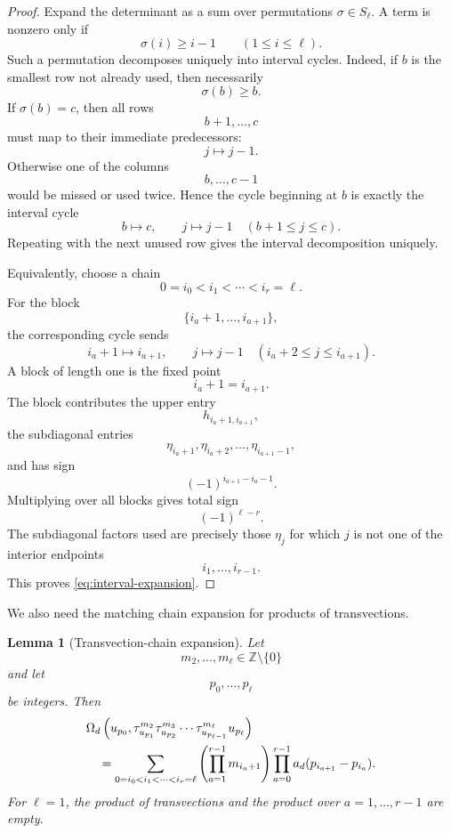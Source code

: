 \documentclass[a4paper,11pt]{amsart}
\newcommand{\Z}{\mathbb Z}
\newtheorem{lemma}[theorem]{Lemma}
\theoremstyle{remark}
\numberwithin{equation}{section}
\begin{document}
\begin{proof}
Expand the determinant as a sum over permutations \(\sigma\in S_\ell\). A term is nonzero only if
\[
\sigma(i)\geq i-1
\qquad(1\leq i\leq\ell).
\]
Such a permutation decomposes uniquely into interval cycles. Indeed, if \(b\) is the smallest row not already used, then necessarily
\[
\sigma(b)\geq b.
\]
If \(\sigma(b)=c\), then all rows
\[
b+1,\ldots,c
\]
must map to their immediate predecessors:
\[
j\longmapsto j-1.
\]
Otherwise one of the columns
\[
b,\ldots,c-1
\]
would be missed or used twice. Hence the cycle beginning at \(b\) is exactly the interval cycle
\[
b\longmapsto c,
\qquad
j\longmapsto j-1
\quad(b+1\leq j\leq c).
\]
Repeating with the next unused row gives the interval decomposition uniquely.

Equivalently, choose a chain
\[
0=i_0<i_1<\cdots<i_r=\ell.
\]
For the block
\[
\{i_a+1,\ldots,i_{a+1}\},
\]
the corresponding cycle sends
\[
i_a+1\longmapsto i_{a+1},
\qquad
j\longmapsto j-1
\quad(i_a+2\leq j\leq i_{a+1}).
\]
A block of length one is the fixed point
\[
i_a+1=i_{a+1}.
\]
The block contributes the upper entry
\[
h_{i_a+1,i_{a+1}},
\]
the subdiagonal entries
\[
\eta_{i_a+1},\eta_{i_a+2},\ldots,\eta_{i_{a+1}-1},
\]
and has sign
\[
(-1)^{i_{a+1}-i_a-1}.
\]
Multiplying over all blocks gives total sign
\[
(-1)^{\ell-r}.
\]
The subdiagonal factors used are precisely those \(\eta_j\) for which \(j\) is not one of the interior endpoints
\[
i_1,\ldots,i_{r-1}.
\]
This proves \eqref{eq:interval-expansion}.
\end{proof}

We also need the matching chain expansion for products of transvections.

\begin{lemma}[Transvection-chain expansion]\label{lem:chain-expansion}
Let
\[
m_2,\ldots,m_\ell\in\Z\setminus\{0\}
\]
and let
\[
p_0,\ldots,p_\ell
\]
be integers. Then
\begin{align}
&\Omega_d\left(
u_{p_0},
\tau_{u_{p_1}}^{m_2}
\tau_{u_{p_2}}^{m_3}
\cdots
\tau_{u_{p_{\ell-1}}}^{m_\ell}
u_{p_\ell}
\right)\notag\\
&\quad=
\sum_{0=i_0<i_1<\cdots<i_r=\ell}
\left(
\prod_{a=1}^{r-1}m_{i_a+1}
\right)
\prod_{a=0}^{r-1}
a_d(p_{i_{a+1}}-p_{i_a}).
\label{eq:chain-expansion}
\end{align}
For \(\ell=1\), the product of transvections and the product over \(a=1,\ldots,r-1\) are empty.
\end{lemma}
\end{document}
